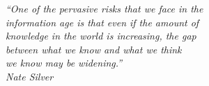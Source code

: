 \begin{epigrafe}
\vspace*{\fill}

\begin{flushright}
    \hspace{7.5cm}
    \textit{
        ``One of the pervasive risks that we face in the \\ information age is
        that even if the amount of \\ knowledge in the world is increasing,
        the gap \\ between what we know and what we think \\ we know may be
        widening.''} \\
        \textit{Nate Silver}
\end{flushright}
\end{epigrafe}